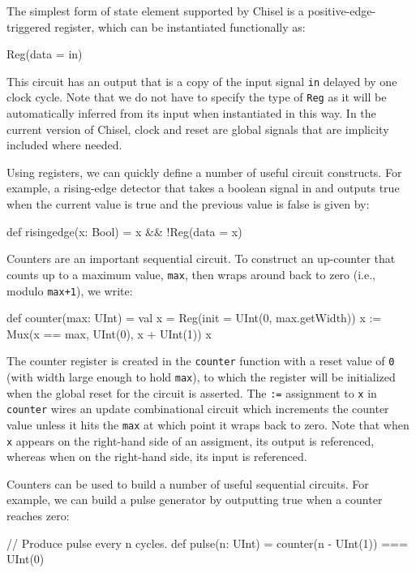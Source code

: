 \documentclass[twocolumn,10pt]{article}
\begin{document}
The simplest form of state element supported by Chisel is a
positive-edge-triggered register, which can be instantiated
functionally as:
\begin{scala}
Reg(data = in)
\end{scala}

\noindent
This circuit has an output that is a copy of the input signal \verb+in+
delayed by one clock cycle.  Note that we do not have to specify the
type of \verb+Reg+ as it will be automatically inferred from its input
when instantiated in this way.  In the current version of Chisel,
clock and reset are global signals that are implicity included where
needed.

Using registers, we can quickly define a number of useful circuit
constructs.  For example, a rising-edge detector that takes a boolean
signal in and outputs true when the current value is true and the
previous value is false is given by:
\begin{scala}
def risingedge(x: Bool) = x && !Reg(data = x)
\end{scala}

Counters are an important sequential circuit.  To construct an
up-counter that counts up to a maximum value, \verb+max+, then wraps
around back to zero (i.e., modulo \verb!max+1!), we write:
\begin{scala}
def counter(max: UInt) = {
  val x = Reg(init = UInt(0, max.getWidth))
  x := Mux(x == max, UInt(0), x + UInt(1))
  x
}
\end{scala}

\noindent
The counter register is created in the \verb!counter! function 
with a reset value of \verb!0! (with width large enough to hold \verb+max+),
to which the register will be initialized when the global reset for the circuit is asserted.
The \verb!:=! assignment to \verb!x! in \verb!counter! wires an update combinational circuit 
which increments the counter value unless it hits the \verb+max+ at which point it wraps back to zero.
Note that when \verb!x! appears on the right-hand side of
an assigment, its output is referenced, whereas when on the right-hand
side, its input is referenced.

Counters can be used to build a number of useful sequential circuits.
For example, we can build a pulse generator by outputting true when
a counter reaches zero:
\begin{scala}
// Produce pulse every n cycles.
def pulse(n: UInt) = counter(n - UInt(1)) === UInt(0)
\end{scala}
\end{document}
